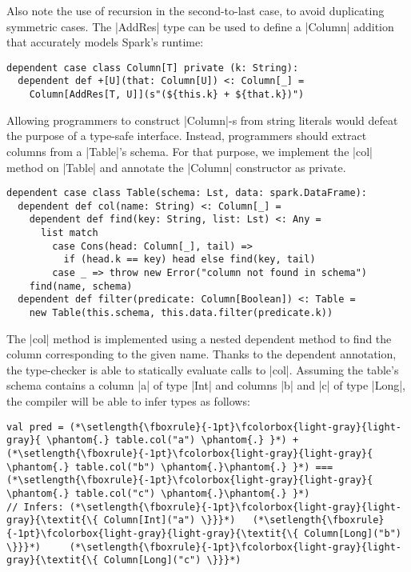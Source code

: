 Also note the use of recursion in the second-to-last case, to avoid duplicating symmetric cases.
The |AddRes| type can be used to define a |Column| addition that accurately models Spark's runtime:

\begin{lstlisting}
dependent case class Column[T] private (k: String):
  dependent def +[U](that: Column[U]) <: Column[_] =
    Column[AddRes[T, U]](s"(${this.k} + ${that.k})")
\end{lstlisting}

Allowing programmers to construct |Column|-s from string literals would defeat the purpose of a type-safe interface.
Instead, programmers should extract columns from a |Table|'s schema.
For that purpose, we implement the |col| method on |Table| and annotate the |Column| constructor as private.

\begin{lstlisting}
dependent case class Table(schema: Lst, data: spark.DataFrame):
  dependent def col(name: String) <: Column[_] =
    dependent def find(key: String, list: Lst) <: Any =
      list match
        case Cons(head: Column[_], tail) =>
          if (head.k == key) head else find(key, tail)
        case _ => throw new Error("column not found in schema")
    find(name, schema)
  dependent def filter(predicate: Column[Boolean]) <: Table =
    new Table(this.schema, this.data.filter(predicate.k))
\end{lstlisting}

The |col| method is implemented using a nested dependent method to find the column corresponding to the given name.
Thanks to the dependent annotation, the type-checker is able to statically evaluate calls to |col|.
Assuming the table's schema contains a column |a| of type |Int| and columns |b| and |c| of type |Long|, the compiler will be able to infer types as follows:

\begin{lstlisting}
val pred = (*\setlength{\fboxrule}{-1pt}\fcolorbox{light-gray}{light-gray}{ \phantom{.} table.col("a") \phantom{.} }*) + (*\setlength{\fboxrule}{-1pt}\fcolorbox{light-gray}{light-gray}{ \phantom{.} table.col("b") \phantom{.}\phantom{.} }*) === (*\setlength{\fboxrule}{-1pt}\fcolorbox{light-gray}{light-gray}{ \phantom{.} table.col("c") \phantom{.}\phantom{.} }*)
// Infers: (*\setlength{\fboxrule}{-1pt}\fcolorbox{light-gray}{light-gray}{\textit{\{ Column[Int]("a") \}}}*)   (*\setlength{\fboxrule}{-1pt}\fcolorbox{light-gray}{light-gray}{\textit{\{ Column[Long]("b") \}}}*)     (*\setlength{\fboxrule}{-1pt}\fcolorbox{light-gray}{light-gray}{\textit{\{ Column[Long]("c") \}}}*)
\end{lstlisting}

